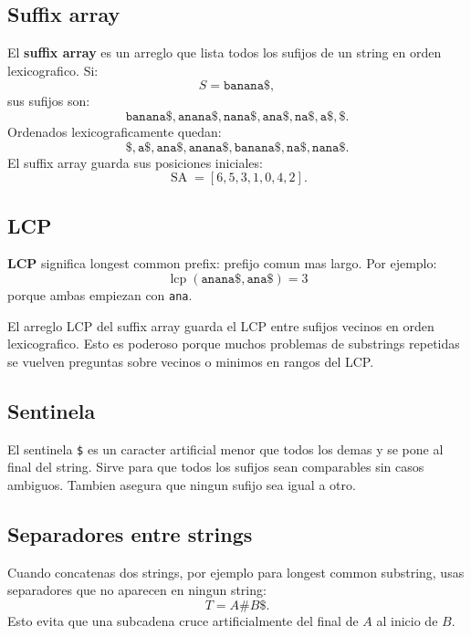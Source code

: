 \documentclass[10pt]{article}
\newcommand{\SA}{\operatorname{SA}}
\begin{document}
\subsection{Suffix array}
El \textbf{suffix array} es un arreglo que lista todos los sufijos de un string
en orden lexicografico. Si:
\[
S=\texttt{banana\$},
\]
sus sufijos son:
\[
\texttt{banana\$},\texttt{anana\$},\texttt{nana\$},\texttt{ana\$},
\texttt{na\$},\texttt{a\$},\texttt{\$}.
\]
Ordenados lexicograficamente quedan:
\[
\texttt{\$},\texttt{a\$},\texttt{ana\$},\texttt{anana\$},
\texttt{banana\$},\texttt{na\$},\texttt{nana\$}.
\]
El suffix array guarda sus posiciones iniciales:
\[
\SA=[6,5,3,1,0,4,2].
\]

\subsection{LCP}
\textbf{LCP} significa longest common prefix: prefijo comun mas largo. Por
ejemplo:
\[
\operatorname{lcp}(\texttt{anana\$},\texttt{ana\$})=3
\]
porque ambas empiezan con \texttt{ana}.

El arreglo LCP del suffix array guarda el LCP entre sufijos vecinos en orden
lexicografico. Esto es poderoso porque muchos problemas de substrings repetidas
se vuelven preguntas sobre vecinos o minimos en rangos del LCP.

\subsection{Sentinela}
El sentinela \texttt{\$} es un caracter artificial menor que todos los demas y
se pone al final del string. Sirve para que todos los sufijos sean comparables
sin casos ambiguos. Tambien asegura que ningun sufijo sea igual a otro.

\subsection{Separadores entre strings}
Cuando concatenas dos strings, por ejemplo para longest common substring, usas
separadores que no aparecen en ningun string:
\[
T=A\#B\$.
\]
Esto evita que una subcadena cruce artificialmente del final de $A$ al inicio de
$B$.
\end{document}
